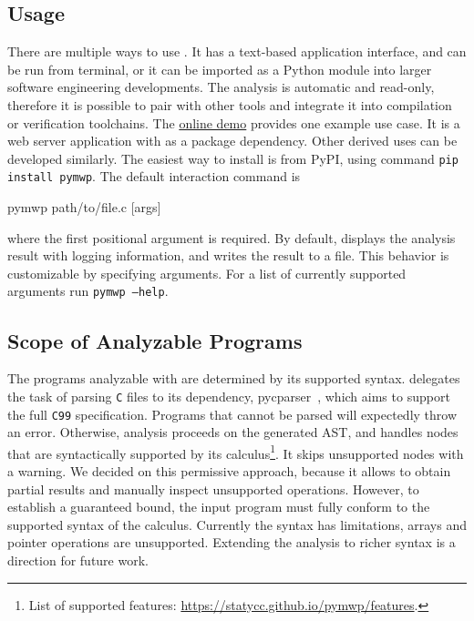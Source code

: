 \documentclass[runningheads]{llncs}
\begin{document}
\subsection{Usage} %
\label{subsec:usage}

There are multiple ways to use \pymwp.
It has a text-based application interface, and can be run from terminal, or it can be imported as a Python module into larger software engineering developments.
The analysis is automatic and read-only, therefore it is possible to pair \pymwp with other tools and integrate it into compilation or verification toolchains.
The \href{https://statycc.github.io/pymwp/demo/}{online demo} provides one example use case.
It is a web server application with \pymwp as a package dependency.
Other derived uses can be developed similarly.
The easiest way to install \pymwp is from PyPI, using command \texttt{pip install pymwp}.
The default interaction command is

\begin{console}
 pymwp path/to/file.c [args]
\end{console}

\noindent where the first positional argument is required.
By default, \pymwp displays the analysis result with logging information, and writes the result to a file.
This behavior is customizable by specifying arguments.
For a list of currently supported arguments run \texttt{pymwp ---help}.

\subsection{Scope of Analyzable Programs} %
\label{subsec:limitations}

The programs analyzable with \pymwp are determined by its supported syntax.
\pymwp delegates the task of parsing \texttt{C} files to its dependency, pycparser~\cite{pycparser}, which aims to support the full \texttt{C99} specification.
Programs that cannot be parsed will expectedly throw an error.
Otherwise, analysis proceeds on the generated AST, and \pymwp handles nodes that are syntactically supported by its calculus\footnote{List of supported features: \url{https://statycc.github.io/pymwp/features}.}.
It skips unsupported nodes with a warning.
We decided on this permissive approach, because it allows to obtain partial results and manually inspect unsupported operations.
However, to establish a guaranteed bound, the input program must fully conform to the supported syntax of the calculus.
Currently the syntax has limitations, \eg arrays and pointer operations are unsupported.
Extending the analysis to richer syntax is a direction for future work.
\end{document}
